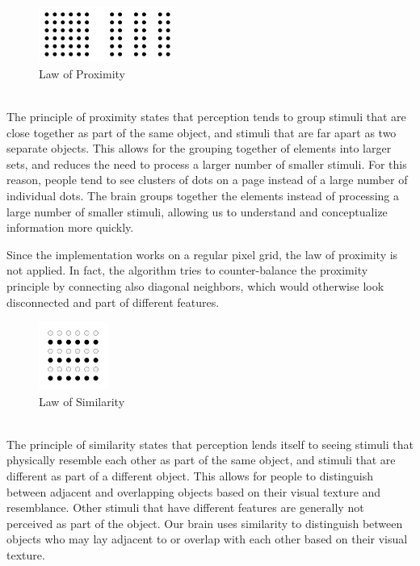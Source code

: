 \documentclass[]{usiinfbachelorproject}
\begin{document}
\begin{figure}
	\centering
	\includegraphics[width=0.4\textwidth]{img/gestalt_proximity.png}
	\caption*{Law of Proximity}
\end{figure}

\\
The principle of proximity states that perception tends to group stimuli that are close together as part of the same object, and stimuli that are far apart as two separate objects. This allows for the grouping together of elements into larger sets, and reduces the need to process a larger number of smaller stimuli. For this reason, people tend to see clusters of dots on a page instead of a large number of individual dots. The brain groups together the elements instead of processing a large number of smaller stimuli, allowing us to understand and conceptualize information more quickly.

Since the implementation works on a regular pixel grid, the law of proximity is not applied. In fact, the algorithm tries to counter-balance the proximity principle by connecting also diagonal neighbors, which would otherwise look disconnected and part of different features.\\

\begin{figure}
	\centering
	\vspace{0.2cm}
	\includegraphics[width=0.2\textwidth]{img/gestalt_similarity.png}
	\caption*{Law of Similarity}
\end{figure}

\\
The principle of similarity states that perception lends itself to seeing stimuli that physically resemble each other as part of the same object, and stimuli that are different as part of a different object. This allows for people to distinguish between adjacent and overlapping objects based on their visual texture and resemblance. Other stimuli that have different features are generally not perceived as part of the object. Our brain uses similarity to distinguish between objects who may lay adjacent to or overlap with each other based on their visual texture.
\end{document}
